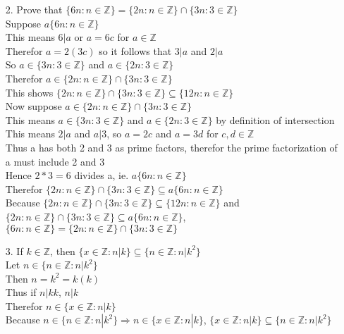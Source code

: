 \documentclass[sigconf]{article}
\begin{document}
\begin{itemize}
  \item[2.] Prove that $\{6n:n\in\mathbb{Z}\}=\{2n:n\in\mathbb{Z}\}\cap\{3n:3\in\mathbb{Z}\}$\\
            Suppose $a\{6n:n\in\mathbb{Z}\}$\\
            This means $6|a$ or $a=6c$ for $a\in\mathbb{Z}$\\
            Therefor $a=2(3c)$ so it follows that $3|a$ and $2|a$\\
            So $a\in\{3n:3\in\mathbb{Z}\}$ and $a\in\{2n:3\in\mathbb{Z}\}$\\
            Therefor $a\in\{2n:n\in\mathbb{Z}\}\cap\{3n:3\in\mathbb{Z}\}$\\
            This shows $\{2n:n\in\mathbb{Z}\}\cap\{3n:3\in\mathbb{Z}\}\subseteq \{12n:n\in\mathbb{Z}\}$\\
            Now suppose $a\in\{2n:n\in\mathbb{Z}\}\cap\{3n:3\in\mathbb{Z}\}$\\
            This means $a\in\{3n:3\in\mathbb{Z}\}$ and $a\in\{2n:3\in\mathbb{Z}\}$ by definition of intersection\\
            This means $2|a$ and $a|3$, so $a=2c$ and $a=3d$ for $c,d\in\mathbb{Z}$\\
            Thus a has both 2 and 3 as prime factors, therefor the prime factorization of a must include 2 and 3\\
            Hence $2*3=6$ divides a, ie. $a\{6n:n\in\mathbb{Z}\}$\\
            Therefor $\{2n:n\in\mathbb{Z}\}\cap\{3n:3\in\mathbb{Z}\}\subseteq a\{6n:n\in\mathbb{Z}\}$\\
            \hspace*{5mm}Because $\{2n:n\in\mathbb{Z}\}\cap\{3n:3\in\mathbb{Z}\}\subseteq \{12n:n\in\mathbb{Z}\}$ and $\{2n:n\in\mathbb{Z}\}\cap\{3n:3\in\mathbb{Z}\}\subseteq a\{6n:n\in\mathbb{Z}\}$, $\{6n:n\in\mathbb{Z}\}=\{2n:n\in\mathbb{Z}\}\cap\{3n:3\in\mathbb{Z}\}$



  \item[3.] If $k\in\mathbb{Z}$, then $\{x\in\mathbb{Z}:n|k\}\subseteq\{n\in\mathbb{Z}:n|k^2\}$\\
            Let $n\in\{n\in\mathbb{Z}:n|k^2\}$\\
            Then $n=k^2=k(k)$\\
            Thus if $n|kk$, $n|k$\\
            Therefor $n\in\{x\in\mathbb{Z}:n|k\}$\\
            Because $n\in\{n\in\mathbb{Z}:n|k^2\}\Rightarrow n\in\{x\in\mathbb{Z}:n|k\}$, $\{x\in\mathbb{Z}:n|k\}\subseteq\{n\in\mathbb{Z}:n|k^2\}$


\end{itemize}
\end{document}
